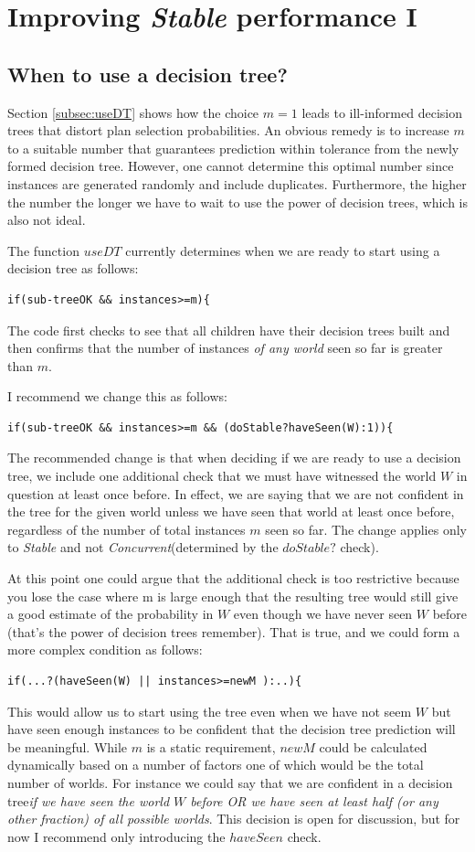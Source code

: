 \documentclass[a4paper]{article}
\newcommand{\cc}{\emph{Concurrent}\xspace}
\newcommand{\st}{\emph{Stable}\xspace}
\newcommand{\dt}{{decision tree}\xspace}
\begin{document}
\section{Improving \textit{Stable} performance I}

\subsection{When to use a \dt?}
\label{sec:deciding-when-to-use}

Section \ref{subsec:useDT} shows how the choice $m=1$ leads to ill-informed {\dt}s that distort plan selection probabilities. An obvious remedy is to increase $m$ to a suitable number that guarantees prediction within tolerance from the newly formed 
\dt. However, one cannot determine this optimal number since instances are generated randomly and include duplicates. Furthermore, the higher the number the longer we have to wait to use the power of {\dt}s, which is also not ideal.

The function $useDT$ currently determines when we are ready to start using a \dt as follows:
\begin{verbatim}
if(sub-treeOK && instances>=m){
\end{verbatim}
The code first checks to see that all children have their {\dt}s built and then confirms that the number of instances \emph{of any world} seen so far is greater than $m$.

I recommend we change this as follows:
\begin{verbatim}
if(sub-treeOK && instances>=m && (doStable?haveSeen(W):1)){
\end{verbatim}
The recommended change is that when deciding if we are ready to use a \dt, we include one additional check that we must have witnessed the world $W$ in question at least once before. In effect, we are saying that we are not confident in the tree for the given world unless we have seen that world at least once before, regardless of the number of total instances $m$ seen so far. The change applies only to \st and not \cc (determined by the $doStable?$ check).

At this point one could argue that the additional check is too restrictive because you lose the case where m is large enough that the resulting tree would still give a good estimate of the probability in $W$ even though we have never seen $W$ before (that's the power of {\dt}s remember). That is true, and we could form a more complex condition as follows:
\begin{verbatim}
if(...?(haveSeen(W) || instances>=newM ):..){
\end{verbatim}
This would allow us to start using the tree even when we have not seem $W$ but have seen enough instances to be confident that the \dt prediction will be meaningful. While $m$ is a static requirement, $newM$ could be calculated dynamically based on a number of factors one of which would be the total number of worlds. For instance we could say that we are confident in a \dt \emph{if we have seen the world $W$ before OR we have seen at least half (or any other fraction) of all possible worlds}. This decision is open for discussion, but for now I recommend only introducing the $haveSeen$ check.
\end{document}
